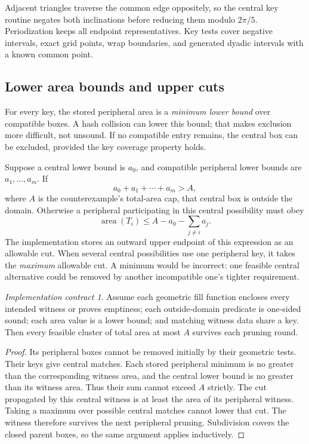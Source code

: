 \documentclass[11pt,a4paper]{article}
\newcommand{\code}[1]{\texttt{\detokenize{#1}}}
\newcommand{\area}{\operatorname{area}}\newcommand{\arc}{\operatorname{arc}}
\theoremstyle{remark}\newtheorem*{contract}{Implementation contract}\newtheorem*{auditnote}{Audit note}
\begin{document}
Adjacent triangles traverse the common edge oppositely, so the central
key routine negates both inclinations before reducing them modulo $2\pi/5$.
Periodization keeps all endpoint representatives. Key tests cover negative
intervals, exact grid points, wrap boundaries, and generated dyadic intervals
with a known common point.

\subsection{Lower area bounds and upper cuts}
For every key, the stored peripheral area is a \emph{minimum lower bound}
over compatible boxes. A hash collision can lower this bound; that makes
exclusion more difficult, not unsound. If no compatible entry remains, the
central box can be excluded, provided the key coverage property holds.

Suppose a central lower bound is $a_0$, and compatible peripheral lower
bounds are $a_1,\ldots,a_m$. If
\[
a_0+a_1+\cdots+a_m>A,
\]
where $A$ is the counterexample's total-area cap, that central box is outside
the domain. Otherwise a peripheral participating in this central possibility
must obey
\[
\area(T_i)\le A-a_0-\sum_{j\ne i}a_j.
\]
The implementation stores an outward upper endpoint of this expression as an
allowable cut. When several central possibilities use one peripheral key,
it takes the \emph{maximum} allowable cut. A minimum would be incorrect:
one feasible central alternative could be removed by another incompatible
one's tighter requirement.



\begin{contract}
Assume each geometric fill function encloses every intended witness or proves
emptiness; each outside-domain predicate is one-sided sound; each area value
is a lower bound; and matching witness data share a key. Then every feasible
cluster of total area at most $A$ survives each pruning round.
\end{contract}
\begin{proof}
Its peripheral boxes cannot be removed initially by their geometric tests.
Their keys give central matches. Each stored peripheral minimum is no greater
than the corresponding witness area, and the central lower bound is no greater
than its witness area. Thus their sum cannot exceed $A$ strictly. The cut
propagated by this central witness is at least the area of its peripheral
witness. Taking a maximum over possible central matches cannot lower that
cut. The witness therefore survives the next peripheral pruning. Subdivision
covers the closed parent boxes, so the same argument applies inductively.
\end{proof}
\end{document}

